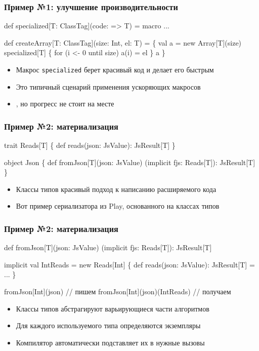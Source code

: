 \documentclass[svgnames,hyperref={bookmarks=false},11pt]{beamer}
\begin{document}
\begin{frame}[fragile]
\frametitle{Пример №1: улучшение производительности}

\begin{semiverbatim}
\alert{def specialized[T: ClassTag](code: => T) = macro ...}

def createArray[T: ClassTag](size: Int, el: T) = \{
  val a = new Array[T](size)
  \alert{specialized[T] \{}
    for (i <- 0 until size) a(i) = el
  \alert{\}}
  a
\}
\end{semiverbatim}

\begin{itemize}
\item Макрос \texttt{specialized} берет красивый код и делает его быстрым
\item Это типичный сценарий применения ускоряющих макросов
\item {}, но прогресс не стоит на месте
\end{itemize}
\end{frame}

\begin{frame}[fragile]
\frametitle{Пример №2: материализация}

\begin{semiverbatim}
trait Reads[T] \{
  def reads(json: JsValue): JsResult[T]
\}

object Json \{
  def fromJson[T](json: JsValue)
    (implicit fjs: Reads[T]): JsResult[T]
\}

\end{semiverbatim}

\begin{itemize}
\item Классы типов \text{\textendash} красивый подход к написанию расширяемого кода
\item Вот пример сериализатора из Play, основанного на классах типов
\end{itemize}
\end{frame}

\begin{frame}[fragile]
\frametitle{Пример №2: материализация}

\begin{semiverbatim}
def fromJson[T](json: JsValue)
  (implicit fjs: Reads[T]): JsResult[T]

implicit val IntReads = new Reads[Int] \{
  def reads(json: JsValue): JsResult[T] = ...
\}

fromJson[Int](json) // пишем
fromJson[Int](json)(IntReads) // получаем

\end{semiverbatim}

\begin{itemize}
\item Классы типов абстрагируют варьирующиеся части алгоритмов
\item Для каждого используемого типа определяются экземпляры
\item Компилятор автоматически подставляет их в нужные вызовы
\end{itemize}
\end{frame}
\end{document}
